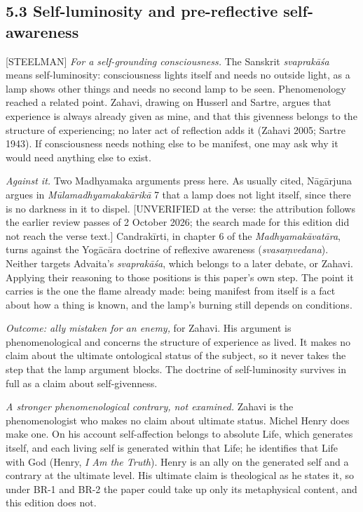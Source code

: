 \documentclass[11pt]{article}
\newcommand{\register}[1]{{\ttfamily\small #1}}
\begin{document}
\subsection*{5.3 Self-luminosity and pre-reflective self-awareness}

\register{[STEELMAN]} \emph{For a self-grounding consciousness.} The Sanskrit \emph{svaprakāśa} means self-luminosity: consciousness lights itself and needs no outside light, as a lamp shows other things and needs no second lamp to be seen. Phenomenology reached a related point. Zahavi, drawing on Husserl and Sartre, argues that experience is always already given as mine, and that this givenness belongs to the structure of experiencing; no later act of reflection adds it (Zahavi 2005; Sartre 1943). If consciousness needs nothing else to be manifest, one may ask why it would need anything else to exist.

\emph{Against it.} Two Madhyamaka arguments press here. As usually cited, Nāgārjuna argues in \emph{Mūlamadhyamakakārikā} 7 that a lamp does not light itself, since there is no darkness in it to dispel. [UNVERIFIED at the verse: the attribution follows the earlier review passes of 2 October 2026; the search made for this edition did not reach the verse text.] Candrakīrti, in chapter 6 of the \emph{Madhyamakāvatāra}, turns against the Yogācāra doctrine of reflexive awareness (\emph{svasaṃvedana}). Neither targets Advaita's \emph{svaprakāśa}, which belongs to a later debate, or Zahavi. Applying their reasoning to those positions is this paper's own step. The point it carries is the one the flame already made: being manifest from itself is a fact about how a thing is known, and the lamp's burning still depends on conditions.

\emph{Outcome: ally mistaken for an enemy,} for Zahavi. His argument is phenomenological and concerns the structure of experience as lived. It makes no claim about the ultimate ontological status of the subject, so it never takes the step that the lamp argument blocks. The doctrine of self-luminosity survives in full as a claim about self-givenness.

\emph{A stronger phenomenological contrary, not examined.} Zahavi is the phenomenologist who makes no claim about ultimate status. Michel Henry does make one. On his account self-affection belongs to absolute Life, which generates itself, and each living self is generated within that Life; he identifies that Life with God (Henry, \emph{I Am the Truth}). Henry is an ally on the generated self and a contrary at the ultimate level. His ultimate claim is theological as he states it, so under BR-1 and BR-2 the paper could take up only its metaphysical content, and this edition does not.
\end{document}
